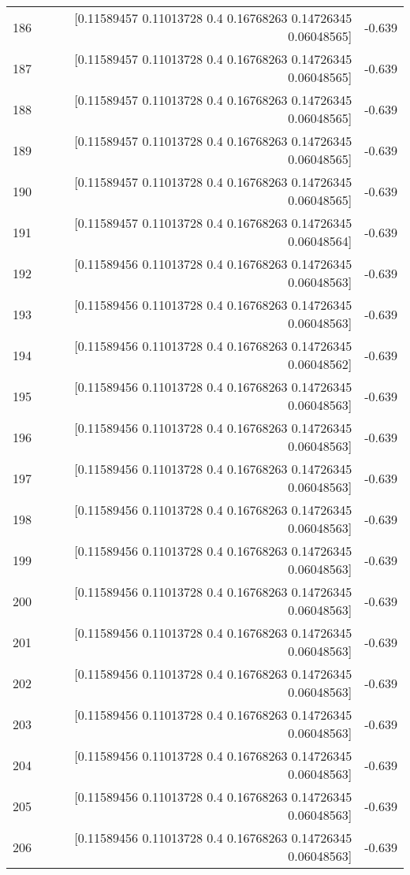\begin{longtable}{lrr}
186 & [0.11589457 0.11013728 0.4        0.16768263 0.14726345 0.06048565] & -0.639 \\
187 & [0.11589457 0.11013728 0.4        0.16768263 0.14726345 0.06048565] & -0.639 \\
188 & [0.11589457 0.11013728 0.4        0.16768263 0.14726345 0.06048565] & -0.639 \\
189 & [0.11589457 0.11013728 0.4        0.16768263 0.14726345 0.06048565] & -0.639 \\
190 & [0.11589457 0.11013728 0.4        0.16768263 0.14726345 0.06048565] & -0.639 \\
191 & [0.11589457 0.11013728 0.4        0.16768263 0.14726345 0.06048564] & -0.639 \\
192 & [0.11589456 0.11013728 0.4        0.16768263 0.14726345 0.06048563] & -0.639 \\
193 & [0.11589456 0.11013728 0.4        0.16768263 0.14726345 0.06048563] & -0.639 \\
194 & [0.11589456 0.11013728 0.4        0.16768263 0.14726345 0.06048562] & -0.639 \\
195 & [0.11589456 0.11013728 0.4        0.16768263 0.14726345 0.06048563] & -0.639 \\
196 & [0.11589456 0.11013728 0.4        0.16768263 0.14726345 0.06048563] & -0.639 \\
197 & [0.11589456 0.11013728 0.4        0.16768263 0.14726345 0.06048563] & -0.639 \\
198 & [0.11589456 0.11013728 0.4        0.16768263 0.14726345 0.06048563] & -0.639 \\
199 & [0.11589456 0.11013728 0.4        0.16768263 0.14726345 0.06048563] & -0.639 \\
200 & [0.11589456 0.11013728 0.4        0.16768263 0.14726345 0.06048563] & -0.639 \\
201 & [0.11589456 0.11013728 0.4        0.16768263 0.14726345 0.06048563] & -0.639 \\
202 & [0.11589456 0.11013728 0.4        0.16768263 0.14726345 0.06048563] & -0.639 \\
203 & [0.11589456 0.11013728 0.4        0.16768263 0.14726345 0.06048563] & -0.639 \\
204 & [0.11589456 0.11013728 0.4        0.16768263 0.14726345 0.06048563] & -0.639 \\
205 & [0.11589456 0.11013728 0.4        0.16768263 0.14726345 0.06048563] & -0.639 \\
206 & [0.11589456 0.11013728 0.4        0.16768263 0.14726345 0.06048563] & -0.639 \\

\end{longtable}
